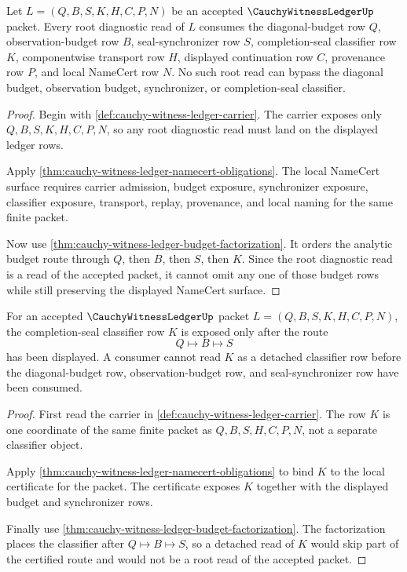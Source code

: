 \begin{theorem}
\label{thm:cauchy-witness-ledger-root-diagnostic-budget-totality}
Let $L=(Q,B,S,K,H,C,P,N)$ be an accepted $\CauchyWitnessLedgerUp$ packet. Every root diagnostic read of $L$ consumes the diagonal-budget row $Q$, observation-budget row $B$, seal-synchronizer row $S$, completion-seal classifier row $K$, componentwise transport row $H$, displayed continuation row $C$, provenance row $P$, and local NameCert row $N$. No such root read can bypass the diagonal budget, observation budget, synchronizer, or completion-seal classifier.
\end{theorem}
\begin{proof}
Begin with \autoref{def:cauchy-witness-ledger-carrier}. The carrier exposes only $Q,B,S,K,H,C,P,N$, so any root diagnostic read must land on the displayed ledger rows.

Apply \autoref{thm:cauchy-witness-ledger-namecert-obligations}. The local NameCert surface requires carrier admission, budget exposure, synchronizer exposure, classifier exposure, transport, replay, provenance, and local naming for the same finite packet.

Now use \autoref{thm:cauchy-witness-ledger-budget-factorization}. It orders the analytic budget route through $Q$, then $B$, then $S$, then $K$. Since the root diagnostic read is a read of the accepted packet, it cannot omit any one of those budget rows while still preserving the displayed NameCert surface.
\end{proof}

\begin{theorem}
\label{thm:cauchy-witness-ledger-root-seal-classifier-lock}
For an accepted $\CauchyWitnessLedgerUp$ packet $L=(Q,B,S,K,H,C,P,N)$, the completion-seal classifier row $K$ is exposed only after the route
$$
Q \longmapsto B \longmapsto S
$$
has been displayed. A consumer cannot read $K$ as a detached classifier row before the diagonal-budget row, observation-budget row, and seal-synchronizer row have been consumed.
\end{theorem}
\begin{proof}
First read the carrier in \autoref{def:cauchy-witness-ledger-carrier}. The row $K$ is one coordinate of the same finite packet as $Q,B,S,H,C,P,N$, not a separate classifier object.

Apply \autoref{thm:cauchy-witness-ledger-namecert-obligations} to bind $K$ to the local certificate for the packet. The certificate exposes $K$ together with the displayed budget and synchronizer rows.

Finally use \autoref{thm:cauchy-witness-ledger-budget-factorization}. The factorization places the classifier after $Q \longmapsto B \longmapsto S$, so a detached read of $K$ would skip part of the certified route and would not be a root read of the accepted packet.
\end{proof}

